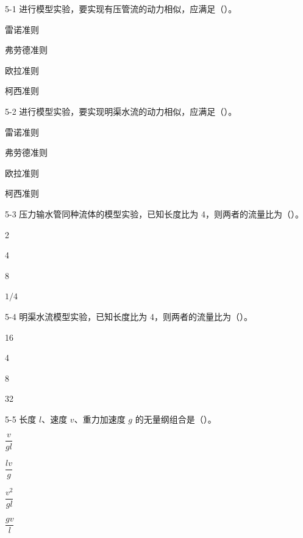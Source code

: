 \begin{ti}

\item[5-1] 进行模型实验，要实现有压管流的动力相似，应满足（\quad）。
\begin{choices}
\item 雷诺准则
\item 弗劳德准则
\item 欧拉准则
\item 柯西准则
\end{choices}

\item[5-2] 进行模型实验，要实现明渠水流的动力相似，应满足（\quad）。
\begin{choices}
\item 雷诺准则
\item 弗劳德准则
\item 欧拉准则
\item 柯西准则
\end{choices}

\item[5-3] 压力输水管同种流体的模型实验，已知长度比为 4，则两者的流量比为（\quad）。
\begin{choices}
\item 2
\item 4
\item 8
\item $1/4$
\end{choices}

\item[5-4] 明渠水流模型实验，已知长度比为 4，则两者的流量比为（\quad）。
\begin{choices}
\item 16
\item 4
\item 8
\item 32
\end{choices}

\item[5-5] 长度 $l$、速度 $v$、重力加速度 $g$ 的无量纲组合是（\quad）。
\begin{choices}
\item $\dfrac{v}{gl}$
\item $\dfrac{lv}{g}$
\item $\dfrac{v^2}{gl}$
\item $\dfrac{gv}{l}$
\end{choices}


\end{ti}

